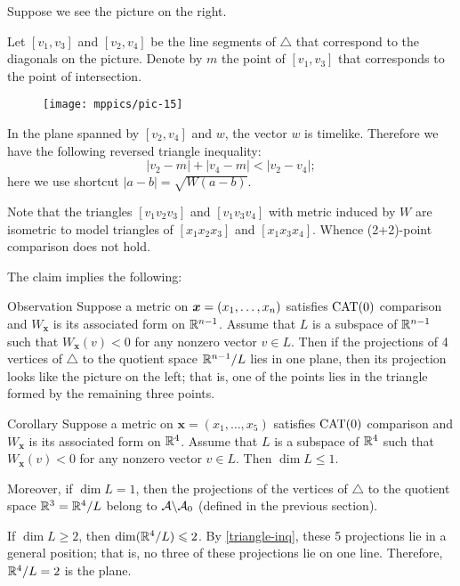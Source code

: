 \documentclass{article}
\begin{document}
Suppose we see the picture on the right.

Let $[v_1,v_3]$ and $[v_2,v_4]$ be the line segments of $\triangle$ that correspond to the diagonals on the picture.
Denote by $m$ the point of $[v_1,v_3]$ that corresponds to the point of intersection.

\begin{wrapfigure}{r}{33mm}
\vskip-4mm
\centering
\texttt{[image: mppics/pic-15]}
\end{wrapfigure}

In the plane spanned by $[v_2,v_4]$ and $w$, the vector $w$ is timelike.
Therefore we have the following reversed triangle inequality:
\[|v_2-m|+|v_4-m|<|v_2-v_4|;\]
here we use shortcut $|a-b|=\sqrt{W(a-b)}$.

Note that the triangles $[v_1v_2v_3]$ and $[v_1v_3v_4]$ with metric induced by $W$ are isometric to model triangles of $[x_1x_2x_3]$ and $[x_1x_3x_4]$.
Whence (2+2)-point comparison does not hold.
\qeds


The claim implies the following:


\begin{thm}{Observation}\label{cat0-proj}
Suppose a metric on $\bm{x}\z=(x_1,\dots,x_n)$ satisfies $\mathrm{CAT}(0)$ comparison
and $W_{\bm{x}}$ is its associated form on $\mathbb{R}^{n-1}$.
Assume that $L$ is a subspace of $\mathbb{R}^{n-1}$ such that
$W_{\bm{x}}(v)< 0$ for any nonzero vector $v\in L$.
Then if the projections of 4 vertices of $\triangle$ to the quotient space $\mathbb{R}^{n-1}/L$ lies in one plane, then its projection looks like the picture on the left;
that is, one of the points lies in the triangle formed by the remaining three points.
\end{thm}

\begin{thm}{Corollary}\label{cor:3+2}
Suppose a metric on $\bm{x}=(x_1,\dots,x_5)$ satisfies $\mathrm{CAT}(0)$ comparison
and $W_{\bm{x}}$ is its associated form on $\mathbb{R}^{4}$.
Assume that $L$ is a subspace of $\mathbb{R}^{4}$ such that
$W_{\bm{x}}(v)< 0$ for any nonzero vector $v\in L$.
Then $\dim L\le 1$.

Moreover, if $\dim L= 1$, then the projections of the vertices of $\triangle$ to the quotient space $\mathbb{R}^3=\mathbb{R}^4/L$ belong to $\mathcal{A}\backslash\mathcal{A}_0$ (defined in the previous section). 
\end{thm}

If $\dim L\ge 2$, then $\mathop{\rm dim}\nolimits (\mathbb{R}^4/L)\leqslant 2$.
By \ref{triangle-inq}, these 5 projections lie in a general position; that is, no three of these projections lie on one line. 
Therefore, $\mathbb{R}^4/L=2$ is the plane.
\end{document}
